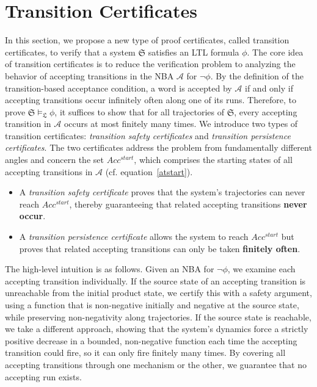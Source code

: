 \section{Transition Certificates}
\label{sec:method}
In this section, we propose a new type of proof certificates, called transition certificates, to verify that a system $\mathfrak{S}$ satisfies an LTL formula $\phi$. The core idea of transition certificates is to reduce the verification problem to analyzing the behavior of accepting transitions in the NBA $\mathcal{A}$ for $\neg\phi$. By the definition of the transition-based acceptance condition, a word is accepted by $\mathcal{A}$ if and only if accepting transitions occur infinitely often along one of its runs. Therefore, to prove $\mathfrak{S} \models_{\mathfrak{L}} \phi$, it suffices to show that for all trajectories of $\mathfrak{S}$, every accepting transition in $\mathcal{A}$ occurs at most finitely many times. We introduce two types of transition certificates: \emph{transition safety certificates} and \emph{transition persistence certificates}. The two certificates address the problem from fundamentally different angles and concern the set $Acc^{start}$, which comprises the starting states of all accepting transitions in $\mathcal{A}$ (cf. equation~\ref{atstart}).

\begin{itemize}
    \item A \emph{transition safety certificate} proves that the system's trajectories can never reach $Acc^{start}$, thereby guaranteeing that related accepting transitions \textbf{never occur}.
    \item A \emph{transition persistence certificate} allows the system to reach $Acc^{start}$ but proves that related accepting transitions can only be taken \textbf{finitely often}.
\end{itemize}

The high-level intuition is as follows. Given an NBA for $\neg\phi$, we examine each accepting transition individually. If the source state of an accepting transition is unreachable from the initial product state, we certify this with a safety argument, using a function that is non-negative initially and negative at the source state, while preserving non-negativity along trajectories. If the source state is reachable, we take a different approach, showing that the system's dynamics force a strictly positive decrease in a bounded, non-negative function each time the accepting transition could fire, so it can only fire finitely many times. By covering all accepting transitions through one mechanism or the other, we guarantee that no accepting run exists.

